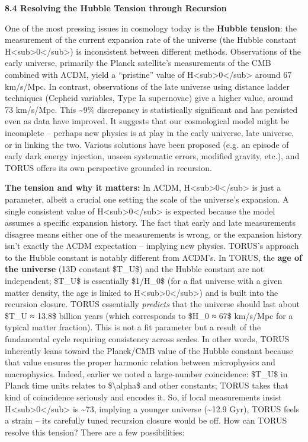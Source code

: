 \documentclass[
]{article}
\begin{document}
\textbf{8.4 Resolving the Hubble Tension through Recursion}

One of the most pressing issues in cosmology today is the \textbf{Hubble
tension}: the measurement of the current expansion rate of the universe
(the Hubble constant
H\textless sub\textgreater0\textless/sub\textgreater) is inconsistent
between different methods. Observations of the early universe, primarily
the Planck satellite's measurements of the CMB combined with ΛCDM, yield
a ``pristine'' value of
H\textless sub\textgreater0\textless/sub\textgreater{} around 67
km/s/Mpc. In contrast, observations of the late universe using distance
ladder techniques (Cepheid variables, Type Ia supernovae) give a higher
value, around 73 km/s/Mpc. This \textasciitilde9\% discrepancy is
statistically significant and has persisted even as data have improved.
It suggests that our cosmological model might be incomplete -- perhaps
new physics is at play in the early universe, late universe, or in
linking the two. Various solutions have been proposed (e.g. an episode
of early dark energy injection, unseen systematic errors, modified
gravity, etc.), and TORUS offers its own perspective grounded in
recursion.

\textbf{The tension and why it matters:} In ΛCDM,
H\textless sub\textgreater0\textless/sub\textgreater{} is just a
parameter, albeit a crucial one setting the scale of the universe's
expansion. A single consistent value of
H\textless sub\textgreater0\textless/sub\textgreater{} is expected
because the model assumes a specific expansion history. The fact that
early and late measurements disagree means either one of the
measurements is wrong, or the expansion history isn't exactly the ΛCDM
expectation -- implying new physics. TORUS's approach to the Hubble
constant is notably different from ΛCDM's. In TORUS, the \textbf{age of
the universe} (13D constant \$T\_U\$) and the Hubble constant are not
independent; \$T\_U\$ is essentially \$1/H\_0\$ (for a flat universe
with a given matter density, the age is linked to
H\textless sub\textgreater0\textless/sub\textgreater) and is built into
the recursion closure. TORUS essentially \emph{predicts} that the
universe should last about \$T\_U ≈ 13.8\$ billion years (which
corresponds to \$H\_0 ≈ 67\$ km/s/Mpc for a typical matter
fraction)\hspace{0pt}. This is not a fit parameter but a result of the
fundamental cycle requiring consistency across scales. In other words,
TORUS inherently leans toward the Planck/CMB value of the Hubble
constant because that value ensures the proper harmonic relation between
microphysics and macrophysics. Indeed, earlier we noted a large-number
coincidence: \$T\_U\$ in Planck time units relates to
\$\textbackslash alpha\$ and other constants; TORUS takes that kind of
coincidence seriously and encodes it. So, if local measurements insist
H\textless sub\textgreater0\textless/sub\textgreater{} is
\textasciitilde73, implying a younger universe (\textasciitilde12.9
Gyr), TORUS feels a strain -- its carefully tuned recursion closure
would be off\hspace{0pt}. How can TORUS resolve this tension? There are
a few possibilities:
\end{document}
